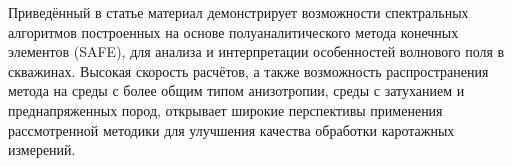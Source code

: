 \documentclass[a4paper,11pt]{article}
\begin{document}

Приведённый в статье материал демонстрирует возможности спектральных алгоритмов построенных на основе полуаналитического метода конечных элементов (SAFE), для анализа и интерпретации особенностей волнового поля в скважинах. Высокая скорость расчётов, а также возможность распространения метода на среды с более общим типом анизотропии, среды с затуханием и преднапряженных пород, открывает широкие перспективы применения рассмотренной методики для улучшения качества обработки каротажных измерений. %

%
%
\clearpage

%
%

%


%
\end{document}
